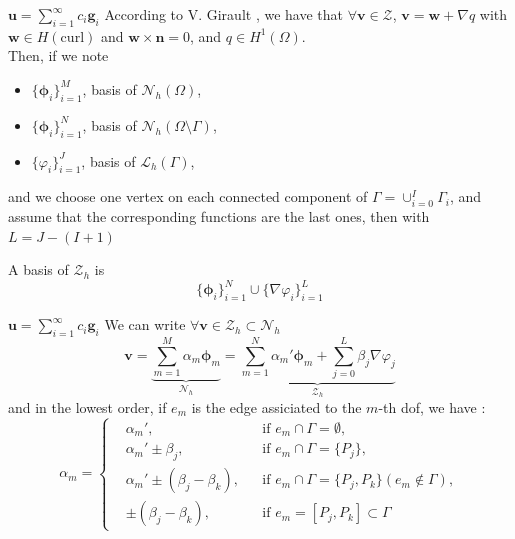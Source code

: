 \documentclass{beamer}
\newcommand{\Z}{{\bm{\mathcal{Z}}}}
\newcommand{\NN}{{\bm{\mathcal{N}}}}
\newcommand{\LLL}{{\bm{\mathcal{L}}}}
\newcommand{\grad}{{\nabla}}
\begin{document}
\begin{frame}{$\mathbf{u}=\sum_{i=1}^\infty c_i\mathbf{g}_i$}
  According to V. Girault \cite{girault90-1}, we have that $\forall\mathbf{v}\in\Z$, $\mathbf{v}=\mathbf{w}+\grad q$ with $\mathbf{w}\in H(\mathrm{curl})$ and $\mathbf{w}\times\mathbf{n}=0$, and $q \in H^1(\Omega)$.\\
  Then, if we note
  \begin{itemize}
  \item $\{\bm{\phi}_i\}_{i=1}^M$, basis of $\NN_h(\Omega)$,
  \item $\{\bm{\phi}_i\}_{i=1}^N$, basis of $\NN_h(\Omega\setminus\Gamma)$,
  \item $\{\varphi_i\}_{i=1}^J$, basis of $\LLL_h(\Gamma)$,
  \end{itemize}
  and we choose one vertex on each connected component of $\Gamma=\cup_{i=0}^I\Gamma_i$, and assume that the corresponding functions are the last ones, then with $L=J-(I+1)$
  \begin{block}{A basis of $\Z_h$ is}
    \[ \{\bm{\phi}_i\}_{i=1}^N\cup\{\grad\varphi_i\}_{i=1}^L \]
  \end{block}
\end{frame}

\begin{frame}{$\mathbf{u}=\sum_{i=1}^\infty c_i\mathbf{g}_i$}
  We can write $\forall \mathbf{v}\in \Z_h \subset \NN_h$
  \[ \mathbf{v}=\underbrace{\sum_{m=1}^M\alpha_m\bm{\phi}_m}_{\NN_h}=\underbrace{\sum_{m=1}^N\alpha_m'\bm{\phi}_m+ \sum_{j=0}^L \beta_j\grad\varphi_j}_{\Z_h} \]
  and in the lowest order, if $e_m$ is the edge assiciated to the $m$-th dof,  we have :
  \[
  \alpha_m=\left\{\begin{aligned}
  &\alpha_m', &&\mbox{if } e_m\cap\Gamma = \emptyset,\\
  &\alpha_m'\pm \beta_j, &&\mbox{if } e_m\cap\Gamma = \{P_j\},\\
  &\alpha_m'\pm (\beta_j-\beta_k), &&\mbox{if } e_m\cap\Gamma = \{P_j,P_k\}
  (e_m\notin\Gamma),\\
  &\pm (\beta_j-\beta_k), &&\mbox{if } e_m=[P_j,P_k]\subset\Gamma
  \end{aligned}\right.
  \]
\end{frame}

\end{document}

